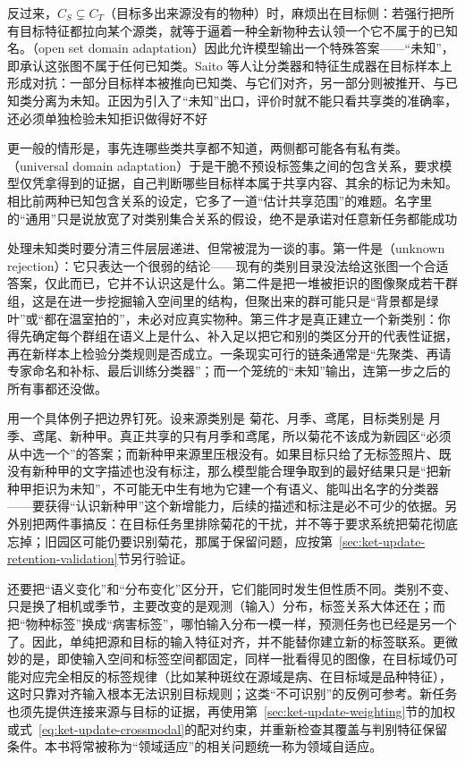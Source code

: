反过来，$C_S\subsetneq C_T$（目标多出来源没有的物种）时，麻烦出在目标侧：若强行把所有目标特征都拉向某个源类，就等于逼着一种全新物种去认领一个它不属于的已知名。（open set domain adaptation）因此允许模型输出一个特殊答案——“未知”，即承认这张图不属于任何已知类。Saito 等人让分类器和特征生成器在目标样本上形成对抗：一部分目标样本被推向已知类、与它们对齐，另一部分则被推开、与已知类分离为未知。正因为引入了“未知”出口，评价时就不能只看共享类的准确率，还必须单独检验未知拒识做得好不好

更一般的情形是，事先连哪些类共享都不知道，两侧都可能各有私有类。（universal domain adaptation）于是干脆不预设标签集之间的包含关系，要求模型仅凭拿得到的证据，自己判断哪些目标样本属于共享内容、其余的标记为未知。相比前两种已知包含关系的设定，它多了一道“估计共享范围”的难题。名字里的“通用”只是说放宽了对类别集合关系的假设，绝不是承诺对任意新任务都能成功

处理未知类时要分清三件层层递进、但常被混为一谈的事。第一件是（unknown rejection）：它只表达一个很弱的结论——现有的类别目录没法给这张图一个合适答案，仅此而已，它并不认识这是什么。第二件是把一堆被拒识的图像聚成若干群组，这是在进一步挖掘输入空间里的结构，但聚出来的群可能只是“背景都是绿叶”或“都在温室拍的”，未必对应真实物种。第三件才是真正建立一个新类别：你得先确定每个群组在语义上是什么、补入足以把它和别的类区分开的代表性证据，再在新样本上检验分类规则是否成立。一条现实可行的链条通常是“先聚类、再请专家命名和补标、最后训练分类器”；而一个笼统的“未知”输出，连第一步之后的所有事都还没做。

用一个具体例子把边界钉死。设来源类别是 {菊花、月季、鸢尾}，目标类别是 {月季、鸢尾、新种甲}。真正共享的只有月季和鸢尾，所以菊花不该成为新园区“必须从中选一个”的答案；而新种甲来源里压根没有。如果目标只给了无标签照片、既没有新种甲的文字描述也没有标注，那么模型能合理争取到的最好结果只是“把新种甲拒识为未知”，不可能无中生有地为它建一个有语义、能叫出名字的分类器——要获得“认识新种甲”这个新增能力，后续的描述和标注是必不可少的依据。另外别把两件事搞反：在目标任务里排除菊花的干扰，并不等于要求系统把菊花彻底忘掉；旧园区可能仍要识别菊花，那属于保留问题，应按第~\ref{sec:ket-update-retention-validation}节另行验证。

还要把“语义变化”和“分布变化”区分开，它们能同时发生但性质不同。类别不变、只是换了相机或季节，主要改变的是观测（输入）分布，标签关系大体还在；而把“物种标签”换成“病害标签”，哪怕输入分布一模一样，预测任务也已经是另一个了。因此，单纯把源和目标的输入特征对齐，并不能替你建立新的标签联系。更微妙的是，即使输入空间和标签空间都固定，同样一批看得见的图像，在目标域仍可能对应完全相反的标签规律（比如某种斑纹在源域是病、在目标域是品种特征），这时只靠对齐输入根本无法识别目标规则；这类“不可识别”的反例可参考。新任务也须先提供连接来源与目标的证据，再使用第~\ref{sec:ket-update-weighting}节的加权或式~\eqref{eq:ket-update-crossmodal}的配对约束，并重新检查其覆盖与判别特征保留条件。本书将常被称为“领域适应”的相关问题统一称为领域自适应。

